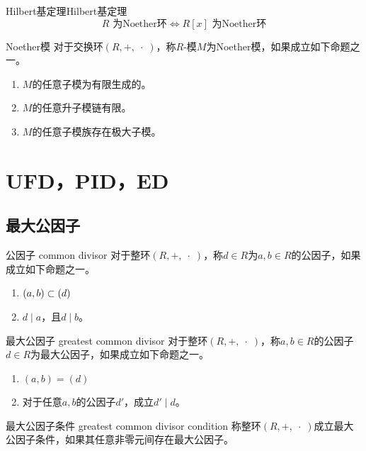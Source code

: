 \begin{lemma}{Hilbert基定理}{Hilbert基定理}
	$$
	R\text{ 为Noether环}\iff
	R[x]\text{ 为Noether环}
	$$
\end{lemma}

\begin{definition}{Noether模}
	对于交换环$(R,+,\;\cdot\;)$，称$R$-模$M$为Noether模，如果成立如下命题之一。
	\begin{enumerate}
		\item $M$的任意子模为有限生成的。
		\item $M$的任意升子模链有限。
		\item $M$的任意子模族存在极大子模。
	\end{enumerate}
\end{definition}

\section{UFD，PID，ED}

\subsection{最大公因子}

\begin{definition}{公因子 common divisor}
	对于整环$(R,+,\;\cdot\;)$，称$d\in R$为$a,b\in R$的公因子，如果成立如下命题之一。
	\begin{enumerate}
		\item $(a,b)\subset (d)$
		\item $d\mid a$，且$d\mid b$。
	\end{enumerate}
\end{definition}

\begin{definition}{最大公因子 greatest common divisor}
	对于整环$(R,+,\;\cdot\;)$，称$a,b\in R$的公因子$d\in R$为最大公因子，如果成立如下命题之一。
	\begin{enumerate}
		\item $(a,b)=(d)$
		\item 对于任意$a,b$的公因子$d'$，成立$d'\mid d$。
	\end{enumerate}
\end{definition}

\begin{definition}{最大公因子条件 greatest common divisor condition}
	称整环$(R,+,\;\cdot\;)$成立最大公因子条件，如果其任意非零元间存在最大公因子。
\end{definition}

